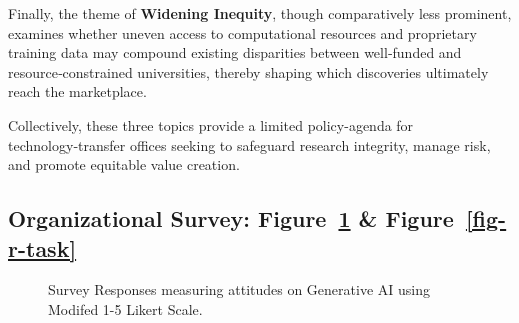 \documentclass[
]{article}
\begin{document}
Finally, the theme of \textbf{Widening Inequity}, though comparatively
less prominent, examines whether uneven access to computational
resources and proprietary training data may compound existing
disparities between well‑funded and resource‑constrained universities,
thereby shaping which discoveries ultimately reach the marketplace.

Collectively, these three topics provide a limited policy-agenda for
technology‑transfer offices seeking to safeguard research integrity,
manage risk, and promote equitable value creation.

\subsection{\texorpdfstring{Organizational Survey: Figure~\ref{fig-r-ai}
\&
Figure~\ref{fig-r-task}}{Organizational Survey: Figure~ \& Figure~}}\label{sec-r-org-survey}

\begin{figure}


\caption{\label{fig-r-ai}Survey Responses measuring attitudes on
Generative AI using Modifed 1-5 Likert Scale.}

\end{figure}%
\end{document}
